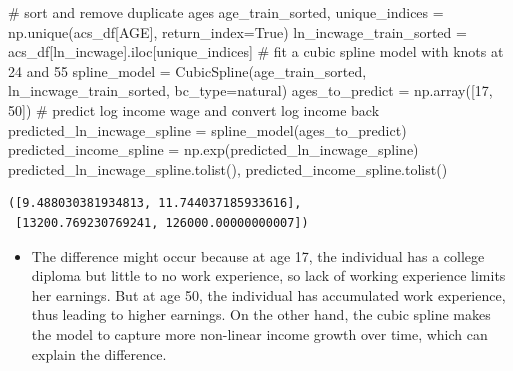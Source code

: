 \documentclass[
  letterpaper,
  DIV=11,
  numbers=noendperiod]{scrartcl}
\newenvironment{Shaded}{\begin{snugshade}}{\end{snugshade}}
\newcommand{\CommentTok}[1]{\textcolor[rgb]{0.37,0.37,0.37}{#1}}
\newcommand{\DecValTok}[1]{\textcolor[rgb]{0.68,0.00,0.00}{#1}}
\newcommand{\NormalTok}[1]{\textcolor[rgb]{0.00,0.23,0.31}{#1}}
\newcommand{\OperatorTok}[1]{\textcolor[rgb]{0.37,0.37,0.37}{#1}}
\newcommand{\StringTok}[1]{\textcolor[rgb]{0.13,0.47,0.30}{#1}}
\newcommand{\VariableTok}[1]{\textcolor[rgb]{0.07,0.07,0.07}{#1}}
\providecommand{\tightlist}{%
  \setlength{\itemsep}{0pt}\setlength{\parskip}{0pt}}\usepackage{longtable,booktabs,array}
\begin{document}
\begin{Shaded}
\begin{Highlighting}[]
\CommentTok{\# sort and remove duplicate ages }
\NormalTok{age\_train\_sorted, unique\_indices }\OperatorTok{=}\NormalTok{ np.unique(acs\_df[}\StringTok{\textquotesingle{}AGE\textquotesingle{}}\NormalTok{], return\_index}\OperatorTok{=}\VariableTok{True}\NormalTok{)}
\NormalTok{ln\_incwage\_train\_sorted }\OperatorTok{=}\NormalTok{ acs\_df[}\StringTok{\textquotesingle{}ln\_incwage\textquotesingle{}}\NormalTok{].iloc[unique\_indices]}
\CommentTok{\# fit a cubic spline model with knots at 24 and 55}
\NormalTok{spline\_model }\OperatorTok{=}\NormalTok{ CubicSpline(age\_train\_sorted, ln\_incwage\_train\_sorted, bc\_type}\OperatorTok{=}\StringTok{\textquotesingle{}natural\textquotesingle{}}\NormalTok{)}
\NormalTok{ages\_to\_predict }\OperatorTok{=}\NormalTok{ np.array([}\DecValTok{17}\NormalTok{, }\DecValTok{50}\NormalTok{])}
\CommentTok{\# predict log income wage and convert log income back}
\NormalTok{predicted\_ln\_incwage\_spline }\OperatorTok{=}\NormalTok{ spline\_model(ages\_to\_predict)}
\NormalTok{predicted\_income\_spline }\OperatorTok{=}\NormalTok{ np.exp(predicted\_ln\_incwage\_spline)}
\NormalTok{predicted\_ln\_incwage\_spline.tolist(), predicted\_income\_spline.tolist()}
\end{Highlighting}
\end{Shaded}

\begin{verbatim}
([9.488030381934813, 11.744037185933616],
 [13200.769230769241, 126000.00000000007])
\end{verbatim}

\begin{itemize}
\tightlist
\item
  The difference might occur because at age 17, the individual has a
  college diploma but little to no work experience, so lack of working
  experience limits her earnings. But at age 50, the individual has
  accumulated work experience, thus leading to higher earnings. On the
  other hand, the cubic spline makes the model to capture more
  non-linear income growth over time, which can explain the difference.
\end{itemize}
\end{document}
